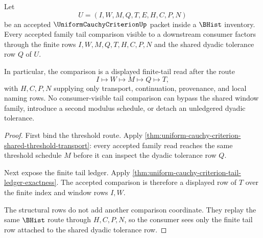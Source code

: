 \begin{theorem}
\label{thm:uniform-cauchy-criterion-root-tail-coverage}
Let
$$
U=(I,W,M,Q,T,E,H,C,P,N)
$$
be an accepted $\UniformCauchyCriterionUp$ packet inside a $\BHist$ inventory. Every accepted family tail comparison visible to a downstream consumer factors through the finite rows $I,W,M,Q,T,H,C,P,N$ and the shared dyadic tolerance row $Q$ of $U$.

In particular, the comparison is a displayed finite-tail read after the route
$$
I \longmapsto W \longmapsto M \longmapsto Q \longmapsto T,
$$
with $H,C,P,N$ supplying only transport, continuation, provenance, and local naming rows. No consumer-visible tail comparison can bypass the shared window family, introduce a second modulus schedule, or detach an unledgered dyadic tolerance.
\end{theorem}
\begin{proof}
First bind the threshold route. Apply \autoref{thm:uniform-cauchy-criterion-shared-threshold-transport}: every accepted family read reaches the same threshold schedule $M$ before it can inspect the dyadic tolerance row $Q$.

Next expose the finite tail ledger. Apply \autoref{thm:uniform-cauchy-criterion-tail-ledger-exactness}. The accepted comparison is therefore a displayed row of $T$ over the finite index and window rows $I,W$.

The structural rows do not add another comparison coordinate. They replay the same $\BHist$ route through $H,C,P,N$, so the consumer sees only the finite tail row attached to the shared dyadic tolerance row.
\end{proof}

